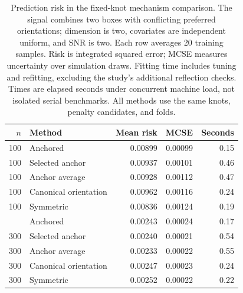 \begin{table}[ht]
\centering
\small
\caption{Prediction risk in the fixed-knot mechanism comparison.
The signal combines two boxes with conflicting preferred orientations;
dimension is two, covariates are independent uniform, and SNR is two.
Each row averages 20 training samples. Risk is integrated squared error;
MCSE measures uncertainty over simulation draws. Fitting time includes
tuning and refitting, excluding the study's additional reflection checks.
Times are elapsed seconds under concurrent machine load, not isolated
serial benchmarks.
All methods use the same knots, penalty candidates, and folds.}
\label{tab:pilot-fixed}

\begin{tabular}{rlrrr}
\toprule
$n$ & Method & Mean risk & MCSE & Seconds\\
\midrule
100 & Anchored & 0.00899 & 0.00099 & 0.15\\
100 & Selected anchor & 0.00937 & 0.00101 & 0.46\\
100 & Anchor average & 0.00928 & 0.00112 & 0.47\\
100 & Canonical orientation & 0.00962 & 0.00116 & 0.24\\
100 & Symmetric & 0.00836 & 0.00124 & 0.19\\
\addlinespace
300 & Anchored & 0.00243 & 0.00024 & 0.17\\
300 & Selected anchor & 0.00240 & 0.00021 & 0.54\\
300 & Anchor average & 0.00233 & 0.00022 & 0.55\\
300 & Canonical orientation & 0.00247 & 0.00023 & 0.24\\
300 & Symmetric & 0.00252 & 0.00022 & 0.22\\
\bottomrule
\end{tabular}
\end{table}
